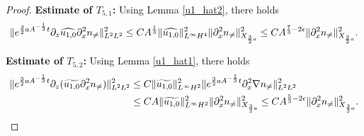 \documentclass[12pt, reqno]{amsart}
\numberwithin{equation}{section}
\begin{document}
\begin{proof}
		\noindent\textbf{Estimate of $T_{5,1}$:}
		Using Lemma \ref{u1_hat2}, there holds 
		\begin{equation*}
			\|{\rm e}^{\frac32aA^{-\frac{1}{3}}t}
			\partial_z\widehat{u_{1,0}}\partial_x^2 n_{\neq}\|_{L^2L^2}^2	
			\leq CA^{\frac13}
			\|\widehat{u_{1,0}}\|_{L^{\infty}H^4}^2	
			\|\partial_x^2 n_{\neq}\|_{X_{\frac32a}}^2
			\leq CA^{\frac73-2\epsilon}\|\partial_x^2 n_{\neq}\|_{X_{\frac32a}}^2.
		\end{equation*}
		
		\noindent\textbf{Estimate of $T_{5,2}$:}
		Using Lemma \ref{u1_hat1}, there holds 
		\begin{equation*}
			\begin{aligned}
				\|{\rm e}^{\frac32aA^{-\frac{1}{3}}t}
				\partial_z(\widetilde{u_{1,0}}\partial_x^2 	n_{\neq})\|_{L^2L^2}^2
				&\leq C\|\widetilde{u_{1,0}}\|_{L^{\infty}H^2}^2
				\|{\rm e}^{\frac32aA^{-\frac{1}{3}}t}
				\partial_x^2\nabla 	n_{\neq}\|_{L^2L^2}^2\\
				&\leq CA\|\widetilde{u_{1,0}}\|_{L^{\infty}H^2}^2
				\|\partial_x^2 n_{\neq}\|_{X_{\frac32a}}^2
				\leq CA^{\frac53-2\epsilon}
				\|\partial_x^2 n_{\neq}\|_{X_{\frac32a}}^2.			
			\end{aligned}
		\end{equation*}
		

\end{proof}
\end{document}
